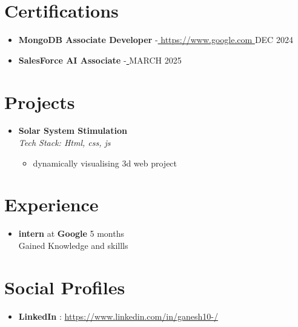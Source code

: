 \documentclass[a4paper,10pt]{article}
\begin{document}
\section*{Certifications}
\begin{itemize}[leftmargin=*]
  
    \item \textbf{ MongoDB Associate Developer } {-}\href{ https://www.google.com }{ https://www.google.com } \hfill{ DEC 2024 }
  
    \item \textbf{ SalesForce AI Associate } {-}\href{  }{  } \hfill{ MARCH 2025 }
  
\end{itemize}



\section*{Projects}
\begin{itemize}[leftmargin=*]
  
    \item \textbf{ Solar System Stimulation }\\
    \textit{Tech Stack: Html, css, js }%
    

    \vspace{-0.5em} %
    \begin{itemize}[leftmargin=1.5em, itemsep=0pt, topsep=0pt]
      
        \item dynamically visualising 3d web project
      
    \end{itemize}
    \vspace{-0.5em} %
  
\end{itemize}




\section*{Experience}
\begin{itemize}[leftmargin=*]
    
    \item \textbf{ intern } at \textbf{ Google } \hfill 5 months \\
    Gained Knowledge and skillls
    
\end{itemize}



\section*{Social Profiles}
\begin{itemize}[leftmargin=*]
  
    \item \textbf{ LinkedIn }: \href{ https://www.linkedin.com/in/ganesh10-/ }{ https://www.linkedin.com/in/ganesh10-/ }
  
\end{itemize}
\end{document}
